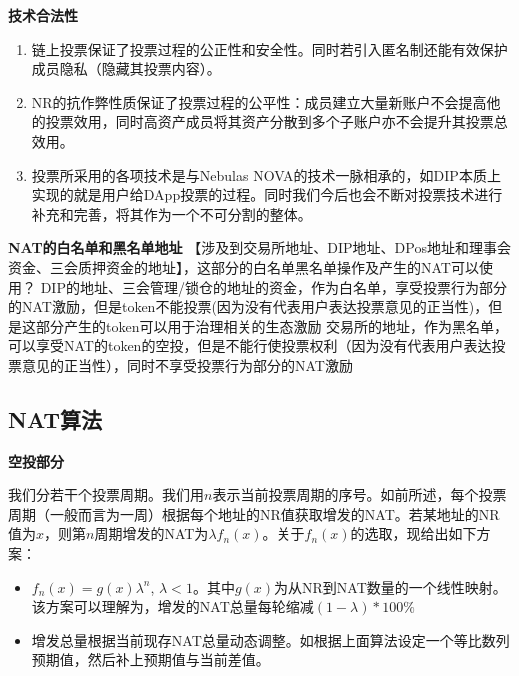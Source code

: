 \textbf{技术合法性}
\begin{enumerate}
\item 链上投票保证了投票过程的公正性和安全性。同时若引入匿名制还能有效保护成员隐私（隐藏其投票内容）。
\item NR的抗作弊性质保证了投票过程的公平性：成员建立大量新账户不会提高他的投票效用，同时高资产成员将其资产分散到多个子账户亦不会提升其投票总效用。
\item 投票所采用的各项技术是与Nebulas NOVA的技术一脉相承的，如DIP本质上实现的就是用户给DApp投票的过程。同时我们今后也会不断对投票技术进行补充和完善，将其作为一个不可分割的整体。
\end{enumerate}

\textbf{NAT的白名单和黑名单地址}
【涉及到交易所地址、DIP地址、DPos地址和理事会资金、三会质押资金的地址】，这部分的白名单黑名单操作及产生的NAT可以使用？
DIP的地址、三会管理/锁仓的地址的资金，作为白名单，享受投票行为部分的NAT激励，但是token不能投票(因为没有代表用户表达投票意见的正当性)，但是这部分产生的token可以用于治理相关的生态激励
交易所的地址，作为黑名单，可以享受NAT的token的空投，但是不能行使投票权利（因为没有代表用户表达投票意见的正当性），同时不享受投票行为部分的NAT激励

\subsection{NAT算法}
\textbf{空投部分}

我们分若干个投票周期。我们用$n$表示当前投票周期的序号。如前所述，每个投票周期（一般而言为一周）根据每个地址的NR值获取增发的NAT。若某地址的NR值为$x$，则第$n$周期增发的NAT为$\lambda f_n(x)$。关于$f_n(x)$的选取，现给出如下方案：


\begin{itemize}
	\item $f_n(x)=g(x)\lambda^n$, $\lambda<1$。其中$g(x)$为从NR到NAT数量的一个线性映射。该方案可以理解为，增发的NAT总量每轮缩减$(1-\lambda)*100\%$
	\item 增发总量根据当前现存NAT总量动态调整。如根据上面算法设定一个等比数列预期值，然后补上预期值与当前差值。
\end{itemize}


